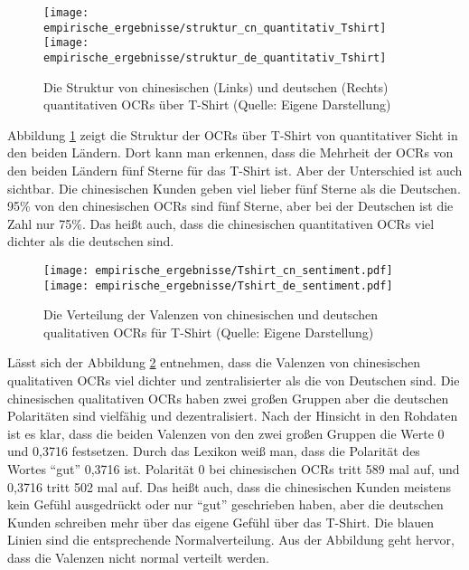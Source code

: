 \begin{figure}[htb]
    {\texttt{[image: empirische\_ergebnisse/struktur\_cn\_quantitativ\_Tshirt]}}    
    {\texttt{[image: empirische\_ergebnisse/struktur\_de\_quantitativ\_Tshirt]}}   
    \caption[Die Struktur von chinesischen und deutschen quantitativen OCRs über T-Shirt]{Die Struktur von chinesischen (Links) und deutschen (Rechts) quantitativen \ac{OCRs} über T-Shirt (Quelle: Eigene Darstellung)}
    \label{fig:struktur_quantitativ_Tshirt}
\end{figure}

Abbildung \ref{fig:struktur_quantitativ_Tshirt} zeigt die Struktur der \ac{OCRs} über T-Shirt von quantitativer Sicht in den beiden Ländern. Dort kann man erkennen, dass die Mehrheit der \ac{OCRs} von den beiden Ländern fünf Sterne für das T-Shirt ist. Aber der Unterschied ist auch sichtbar. Die chinesischen Kunden geben viel lieber fünf Sterne als die Deutschen. 95\% von den chinesischen \ac{OCRs} sind fünf Sterne, aber bei der Deutschen ist die Zahl nur 75\%. Das heißt auch, dass die chinesischen quantitativen \ac{OCRs} viel dichter als die deutschen sind.

\begin{figure}[htb]
    \texttt{[image: empirische\_ergebnisse/Tshirt\_cn\_sentiment.pdf]}
    \endminipage\hfill
    \texttt{[image: empirische\_ergebnisse/Tshirt\_de\_sentiment.pdf]}
    \endminipage 
    \caption[Die Verteilung der Valenzen von chinesischen und deutschen qualitativen OCRs für T-Shirt]{Die Verteilung der Valenzen von chinesischen und deutschen qualitativen \ac{OCRs} für T-Shirt (Quelle: Eigene Darstellung)}
    \label{fig:valenz_Tshirt}
\end{figure}

Lässt sich der Abbildung \ref{fig:valenz_Tshirt} entnehmen, dass die Valenzen von chinesischen qualitativen \ac{OCRs} viel dichter und zentralisierter als die von Deutschen sind. Die chinesischen qualitativen OCRs haben zwei großen Gruppen aber die deutschen Polaritäten sind vielfähig und dezentralisiert. Nach der Hinsicht in den Rohdaten ist es klar, dass die beiden Valenzen von den zwei großen Gruppen die Werte 0 und 0,3716 festsetzen. Durch das Lexikon weiß man, dass die Polarität des Wortes “gut” 0,3716 ist. Polarität 0 bei chinesischen OCRs tritt 589 mal auf, und 0,3716 tritt 502 mal auf. Das heißt auch, dass die chinesischen Kunden meistens kein Gefühl ausgedrückt oder nur “gut” geschrieben haben, aber die deutschen Kunden schreiben mehr über das eigene Gefühl über das T-Shirt. Die blauen Linien sind die entsprechende Normalverteilung. Aus der Abbildung geht hervor, dass die Valenzen nicht normal verteilt werden.

